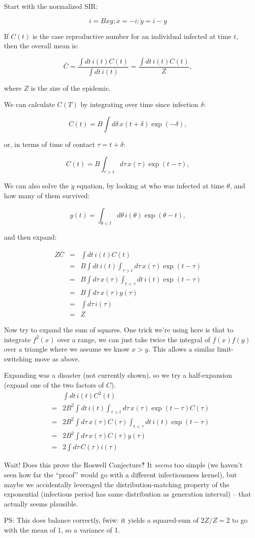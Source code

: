 \documentclass[12pt]{article}
\begin{document}
Start with the normalized SIR:

$$ i = Bxy; \dot x = -i; \dot y = i-y $$

If $C(t)$ is the case reproductive number for an individual infected at time $t$, then the overall mean is:

$$
	\bar C 
	= \frac{\int{dt\, i(t) C(t)}}{\int{dt\, i(t)}}
	= \frac{\int{dt\, i(t) C(t)}}{Z}, 
$$

where $Z$ is the size of the epidemic.

We can calculate $C(T)$ by integrating over time since infection $\delta$:

$$C(t) = B \int{d\delta\, x(t+\delta) \exp(-\delta)}, $$

or, in terms of time of contact $\tau=t+\delta$:

$$C(t) = B \int_{\tau>t}{d\tau\, x(\tau) \exp(t-\tau)}, $$

We can also solve the $\dot y$ equation, by looking at who was infected at time $\theta$, and how many of them survived:

$$ y(t) = \int_{\theta<t}{d\theta\, i(\theta)\exp(\theta-t)},$$

and then expand:

\begin{eqnarray}
	Z \bar C
	&=& \int{dt\, i(t) C(t)}
	\\ &=& B \int{dt\, i(t) \int_{\tau>t}{d\tau\, x(\tau) \exp(t-\tau)}}
	\\ &=& B \int{d\tau\, x(\tau) \int_{t<\tau}dt\, i(t) \exp(t-\tau)}
	\\ &=& B \int{d\tau\, x(\tau) y(\tau)}
	\\ &=& \int{d\tau\, i(\tau)}
	\\ &=& Z
\end{eqnarray}

Now try to expand the sum of squares. One trick we're using here is that to integrate $f^2(x)$ over a range, we can just take twice the integral of $f(x)f(y)$ over a triangle where we assume we know $x>y$. This allows a similar limit-switching move as above.

Expanding was a disaster (not currently shown), so we try a half-expansion (expand one of the two factors of $C$).
\begin{eqnarray}
	&& \int{dt\, i(t) C^2(t)}
	\\ &=& 2B^2 \int{dt\, i(t) \int_{\tau>t}{d\tau\, x(\tau) \exp(t-\tau) C(\tau)}}
	\\ &=& 2B^2 \int{d\tau\, x(\tau) C(\tau) \int_{t<\tau}{dt\, i(t) \exp(t-\tau)}}
	\\ &=& 2B^2 \int{d\tau\, x(\tau) C(\tau) y(\tau)}
	\\ &=& 2 \int{d\tau\, C(\tau) i(\tau)}
\end{eqnarray}

Wait! Does this prove the Roswell Conjecture‽ It \emph{seems} too simple (we haven't seen how far the “proof” would go with a different infectiousness kernel), but maybe we accidentally leveraged the distribution-matching property of the exponential (infectious period has same distribution as generation interval) – that actually seems plausible.

PS: This does balance correctly, fwiw: it yields a squared-sum of $2Z/Z = 2$ to go with the mean of 1, so a variance of 1.
\end{document}

